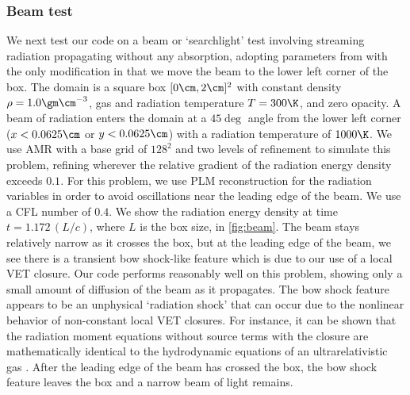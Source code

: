 \documentclass[fleqn,usenatbib]{mnras}
\begin{document}
\subsubsection{Beam test}
\label{ssec:beam}
We next test our code on a beam or `searchlight' test involving streaming radiation propagating without any absorption, adopting parameters from \cite{Gonzalez_2007} with the only modification in that we move the beam to the lower left corner of the box. The domain is a square box $[0 \cm, 2 \cm]^2$ with constant density $\rho = 1.0 \gm \cm^{-3}$, gas and radiation temperature $T = 300 \K$, and zero opacity. A beam of radiation enters the domain at a $45 \deg$ angle from the lower left corner ($x < 0.0625 \cm$ or $y < 0.0625 \cm$) with a radiation temperature of $1000 \K$. We use AMR with a base grid of $128^2$ and two levels of refinement to simulate this problem, refining wherever the relative gradient of the radiation energy density exceeds $0.1$. For this problem, we use PLM reconstruction for the radiation variables in order to avoid oscillations near the leading edge of the beam. We use a CFL number of $0.4$. We show the radiation energy density at time $t =  1.172 \, (L/c)$, where $L$ is the box size, in \autoref{fig:beam}. The beam stays relatively narrow as it crosses the box, but at the leading edge of the beam, we see there is a transient bow shock-like feature which is due to our use of a local VET closure. Our code performs reasonably well on this problem, showing only a small amount of diffusion of the beam as it propagates. The bow shock feature appears to be an unphysical `radiation shock' that can occur due to the nonlinear behavior of non-constant local VET closures. For instance, it can be shown that the radiation moment equations without source terms with the \cite{Levermore_1984} closure are mathematically identical to the hydrodynamic equations of an ultrarelativistic gas \citep{Hanawa_2014}. After the leading edge of the beam has crossed the box, the bow shock feature leaves the box and a narrow beam of light remains.
\end{document}
